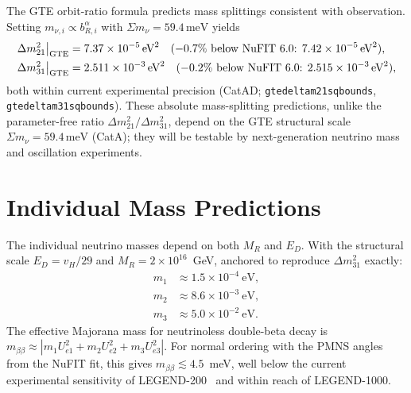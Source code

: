 \documentclass[12pt,a4paper]{article}
\theoremstyle{definition}
\theoremstyle{remark}
\newcommand{\lean}[1]{%
  \penalty-100
  \begingroup\def\_{\textunderscore\allowbreak}\texttt{#1}\endgroup}
\begin{document}
The GTE orbit-ratio formula predicts mass splittings consistent with observation.
Setting $m_{\nu,i} \propto b_{R,i}^\alpha$ with $\Sigma m_\nu = 59.4\,\text{meV}$
yields
\begin{align}
  \Delta m^2_{21}\big|_{\rm GTE} &= 7.37 \times 10^{-5}\,\text{eV}^2
    \quad (-0.7\%\text{ below NuFIT~6.0: } 7.42\times10^{-5}\,\text{eV}^2),
    \label{eq:deltam21_gte} \\
  \Delta m^2_{31}\big|_{\rm GTE} &= 2.511 \times 10^{-3}\,\text{eV}^2
    \quad (-0.2\%\text{ below NuFIT~6.0: } 2.515\times10^{-3}\,\text{eV}^2),
    \label{eq:deltam31_gte}
\end{align}
both within current experimental precision
(CatAD; \lean{gte\_delta\_m21\_sq\_bounds}, \lean{gte\_delta\_m31\_sq\_bounds}).
These absolute mass-splitting predictions, unlike the parameter-free ratio
$\Delta m^2_{21}/\Delta m^2_{31}$, depend on the GTE structural scale
$\Sigma m_\nu = 59.4\,\text{meV}$ (CatA); they will be testable
by next-generation neutrino mass and oscillation experiments.

\section{Individual Mass Predictions}
\label{sec:masses}

The individual neutrino masses depend on both $M_R$ and $E_D$.
With the structural scale $E_D = v_H/29$ and $M_R = 2\times 10^{16}$~GeV,
anchored to reproduce $\Delta m^2_{31}$ exactly:
\begin{align}
  m_1 &\approx 1.5 \times 10^{-4}~\text{eV}, \nonumber\\
  m_2 &\approx 8.6 \times 10^{-3}~\text{eV}, \nonumber\\
  m_3 &\approx 5.0 \times 10^{-2}~\text{eV}. \label{eq:masses}
\end{align}
The effective Majorana mass for neutrinoless double-beta decay
is $m_{\beta\beta} \approx |m_1 U_{e1}^2 + m_2 U_{e2}^2 + m_3 U_{e3}^2|$.
For normal ordering with the PMNS angles from the NuFIT fit,
this gives $m_{\beta\beta} \lesssim 4.5$~meV,
well below the current experimental sensitivity of LEGEND-200~\cite{LEGEND200}
and within reach of LEGEND-1000.

\end{document}

